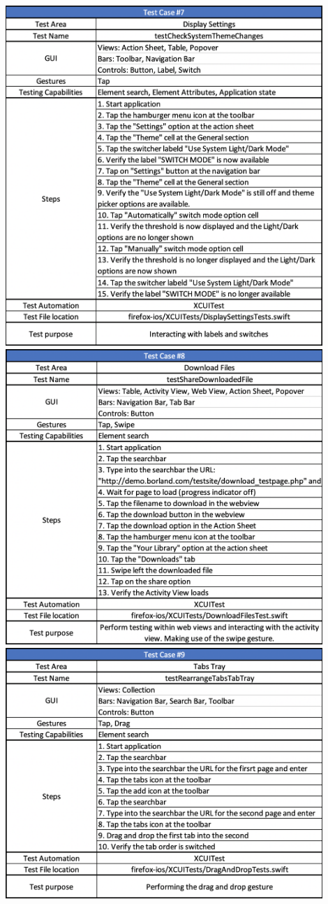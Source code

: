 \includegraphics[width=12cm]{img/tc7.png} \\[2mm]
\includegraphics[width=12cm]{img/tc8.png} \\[2mm]
\includegraphics[width=12cm]{img/tc9.png} \\[2mm]
